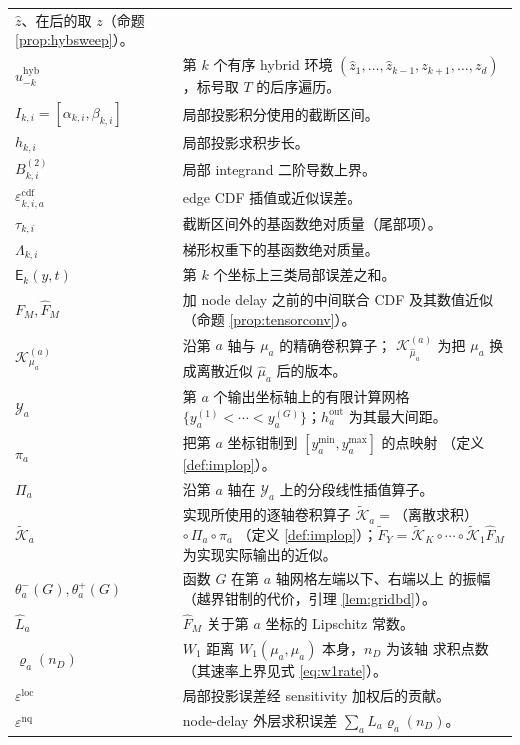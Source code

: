 \documentclass[a4paper,11pt]{article}
\theoremstyle{definition}
\newcommand{\1}{\mathbf 1}
\newcommand{\Eerr}{\mathsf E}
\newcommand{\ecdf}{\varepsilon^{\mathrm{cdf}}}
\begin{document}
\begin{longtable}{>{\raggedright\arraybackslash}p{}
                  >{\raggedright\arraybackslash}p{}}
$\widehat z$、在后的取 $z$（命题 \ref{prop:hybsweep}）。\\
$u_{-k}^{\mathrm{hyb}}$ & 第 $k$ 个有序 hybrid 环境
$(\widehat z_1,\ldots,\widehat z_{k-1},z_{k+1},\ldots,z_d)$，标号取
$T$ 的后序遍历。\\
$I_{k,i}=[\alpha_{k,i},\beta_{k,i}]$ & 局部投影积分使用的截断区间。\\
$h_{k,i}$ & 局部投影求积步长。\\
$B_{k,i}^{(2)}$ & 局部 integrand 二阶导数上界。\\
$\ecdf_{k,i,a}$ & edge CDF 插值或近似误差。\\
$\tau_{k,i}$ & 截断区间外的基函数绝对质量（尾部项）。\\
$\Lambda_{k,i}$ & 梯形权重下的基函数绝对质量。\\
$\Eerr_k(y,t)$ & 第 $k$ 个坐标上三类局部误差之和。\\
$F_M,\widehat F_M$ & 加 node delay 之前的中间联合 CDF 及其数值近似
（命题 \ref{prop:tensorconv}）。\\
$\mathcal K_{\mu_a}^{(a)}$ & 沿第 $a$ 轴与 $\mu_a$ 的精确卷积算子；
$\mathcal K_{\widehat\mu_a}^{(a)}$ 为把 $\mu_a$ 换成离散近似 $\widehat\mu_a$
后的版本。\\
$\mathcal Y_a$ & 第 $a$ 个输出坐标轴上的有限计算网格
$\{y_a^{(1)}<\cdots<y_a^{(G)}\}$；$h_a^{\mathrm{out}}$ 为其最大间距。\\
$\pi_a$ & 把第 $a$ 坐标钳制到 $[y_a^{\min},y_a^{\max}]$ 的点映射
（定义 \ref{def:implop}）。\\
$\Pi_a$ & 沿第 $a$ 轴在 $\mathcal Y_a$ 上的分段线性插值算子。\\
$\widetilde{\mathcal K}_a$ & 实现所使用的逐轴卷积算子
$\widetilde{\mathcal K}_a=$（离散求积）$\circ\,\Pi_a\circ\pi_a$
（定义 \ref{def:implop}）；$\widetilde F_Y=\widetilde{\mathcal K}_K\circ
\cdots\circ\widetilde{\mathcal K}_1\widehat F_M$ 为实现实际输出的近似。\\
$\theta_a^-(G),\theta_a^+(G)$ & 函数 $G$ 在第 $a$ 轴网格左端以下、右端以上
的振幅（越界钳制的代价，引理 \ref{lem:gridbd}）。\\
$\widehat L_a$ & $\widehat F_M$ 关于第 $a$ 坐标的 Lipschitz 常数。\\
$\varrho_a(n_D)$ & $W_1$ 距离 $W_1(\mu_a,\widehat\mu_a)$ 本身，$n_D$ 为该轴
求积点数（其速率上界见式 \eqref{eq:w1rate}）。\\
$\varepsilon^{\mathrm{loc}}$ & 局部投影误差经 sensitivity 加权后的贡献。\\
$\varepsilon^{\mathrm{nq}}$ & node-delay 外层求积误差
$\sum_a\widehat L_a\varrho_a(n_D)$。\\

\end{longtable}
\end{document}
